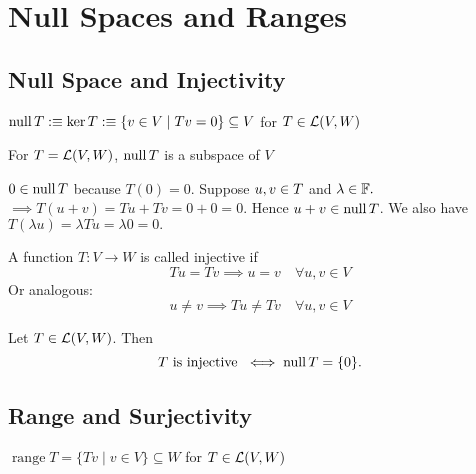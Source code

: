 \section{Null Spaces and Ranges}

\subsection{Null Space and Injectivity}

\begin{mydef} 
  $\operatorname{null} T :\equiv \ker T :\equiv \{ v \in V \mid Tv=0\} \subseteq V$ for $T \in {\mathcal{L}(V,W)}$
\end{mydef}

\setcounter{thm}{12}
\begin{thm} 
  For $T=\mathcal{L}(V, W)$, $\operatorname{null} T$ is a subspace of $V$ 
\end{thm}
\begin{prf}
  $0 \in \operatorname{null} T$ because $T(0) = 0$. Suppose $u,v \in \null T$ and $\lambda \in \mathbb{F}.$ $\implies T(u+v)=Tu+Tv=0+0=0.$ Hence $u+v \in \operatorname{null} T$. We also have $T(\lambda u)= \lambda Tu = \lambda 0 = 0.$
\end{prf}

\setcounter{thm}{13}
\begin{mydef} [injective]
  A function $T: V \to W$ is called injective if
  \begin{equation}
    Tu = Tv \implies u = v \quad \forall u,v \in V
  \end{equation}
  Or analogous:
  \begin{equation}
    u \neq v \implies Tu \neq Tv \quad \forall u,v \in V
  \end{equation}
\end{mydef}

\setcounter{thm}{14}
\begin{thm} 
  \label{thm: injectivity iff null space equals zero-set}
  Let $T \in \mathcal{L}(V,W)$. Then
  \begin{equation}
    T \text{ is injective } \iff \operatorname{null} T = \{0 \}.
  \end{equation}
\end{thm}

\subsection{Range and Surjectivity}

\setcounter{thm}{15}
\begin{mydef} [range]
  $\operatorname{range}T= \{Tv \mid v \in V\} \subseteq W$ for $T \in {\mathcal{L}(V,W)}$
\end{mydef}

